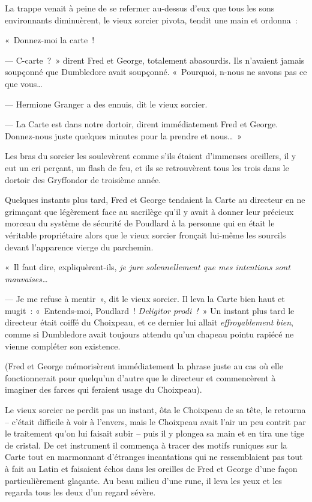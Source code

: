 La trappe venait à peine de se refermer au-dessus d'eux que tous les sons environnants diminuèrent, le vieux sorcier pivota, tendit une main et ordonna~:

«~Donnez-moi la carte~!

--- C-carte~?~»
dirent Fred et George, totalement abasourdis.
Ils n'avaient jamais soupçonné que Dumbledore avait soupçonné.
«~Pourquoi, n-nous ne savons pas ce que vous…

--- Hermione Granger a des ennuis, dit le vieux sorcier.

--- La Carte est dans notre dortoir, dirent immédiatement Fred et George.
Donnez-nous juste quelques minutes pour la prendre et nous…~»

Les bras du sorcier les soulevèrent comme s'ils étaient d'immenses oreillers, il y eut un cri perçant, un flash de feu, et ils se retrouvèrent tous les trois dans le dortoir des Gryffondor de troisième année.

Quelques instants plus tard, Fred et George tendaient la Carte au directeur en ne grimaçant que légèrement face au sacrilège qu'il y avait à donner leur précieux morceau du système de sécurité de Poudlard à la personne qui en était le véritable propriétaire alors que le vieux sorcier fronçait lui-même les sourcils devant l'apparence vierge du parchemin.

«~Il faut dire, expliquèrent-ils, \emph{je jure solennellement que mes intentions sont mauvaises…}

--- Je me refuse à mentir~», dit le vieux sorcier.
Il leva la Carte bien haut et mugit~: «~Entends-moi, Poudlard~!
\emph{Deligitor prodi~!}~» Un instant plus tard le directeur était coiffé du Choixpeau, et ce dernier lui allait \emph{effroyablement} \emph{bien}, comme si Dumbledore avait toujours attendu qu'un chapeau pointu rapiécé ne vienne compléter son existence.

(Fred et George mémorisèrent immédiatement la phrase juste au cas où elle fonctionnerait pour quelqu'un d'autre que le directeur et commencèrent à imaginer des farces qui feraient usage du Choixpeau).

Le vieux sorcier ne perdit pas un instant, ôta le Choixpeau de sa tête, le retourna -- c'était difficile à voir à l'envers, mais le Choixpeau avait l'air un peu contrit par le traitement qu'on lui faisait subir -- puis il y plongea sa main et en tira une tige de cristal.
De cet instrument il commença à tracer des motifs runiques sur la Carte tout en marmonnant d'étranges incantations qui ne ressemblaient pas tout à fait au Latin et faisaient échos dans les oreilles de Fred et George d'une façon particulièrement glaçante.
Au beau milieu d'une rune, il leva les yeux et les regarda tous les deux d'un regard sévère.

